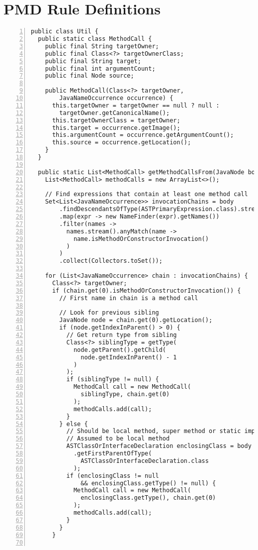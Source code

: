 \chapter{PMD Rule Definitions}
\label{apx:pmd}

\begin{lstlisting}[caption={Utility class which attempts to extract the required information about method calls from the Abstract Syntax Tree.}, captionpos=b, label=lst:pmd_util, numbers=left, showstringspaces=false]
public class Util {
  public static class MethodCall {
    public final String targetOwner;
    public final Class<?> targetOwnerClass;
    public final String target;
    public final int argumentCount;
    public final Node source;

    public MethodCall(Class<?> targetOwner,
        JavaNameOccurrence occurrence) {
      this.targetOwner = targetOwner == null ? null :
        targetOwner.getCanonicalName();
      this.targetOwnerClass = targetOwner;
      this.target = occurrence.getImage();
      this.argumentCount = occurrence.getArgumentCount();
      this.source = occurrence.getLocation();
    }
  }

  public static List<MethodCall> getMethodCallsFrom(JavaNode body){
    List<MethodCall> methodCalls = new ArrayList<>();

    // Find expressions that contain at least one method call
    Set<List<JavaNameOccurrence>> invocationChains = body
        .findDescendantsOfType(ASTPrimaryExpression.class).stream()
        .map(expr -> new NameFinder(expr).getNames())
        .filter(names ->
          names.stream().anyMatch(name ->
            name.isMethodOrConstructorInvocation()
          )
        )
        .collect(Collectors.toSet());

    for (List<JavaNameOccurrence> chain : invocationChains) {
      Class<?> targetOwner;
      if (chain.get(0).isMethodOrConstructorInvocation()) {
        // First name in chain is a method call

        // Look for previous sibling
        JavaNode node = chain.get(0).getLocation();
        if (node.getIndexInParent() > 0) {
          // Get return type from sibling
          Class<?> siblingType = getType(
            node.getParent().getChild(
              node.getIndexInParent() - 1
            )
          );
          if (siblingType != null) {
            MethodCall call = new MethodCall(
              siblingType, chain.get(0)
            );
            methodCalls.add(call);
          }
        } else {
          // Should be local method, super method or static import
          // Assumed to be local method
          ASTClassOrInterfaceDeclaration enclosingClass = body
            .getFirstParentOfType(
              ASTClassOrInterfaceDeclaration.class
            );
          if (enclosingClass != null
              && enclosingClass.getType() != null) {
            MethodCall call = new MethodCall(
              enclosingClass.getType(), chain.get(0)
            );
            methodCalls.add(call);
          }
        }
      }


\end{lstlisting}
